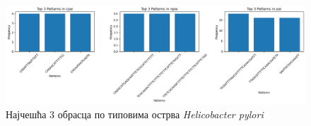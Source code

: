 \documentclass[12pt]{article}
\begin{document}
\begin{figure}[htbp]
    \centering
    \includegraphics[width=\linewidth]{images/top_3_cpai_h_pylori.png}
    \caption{Најчешћа 3 обрасца по типовима острва \textit{Helicobacter pylori}}
    \label{fig:top3_by_islands}
\end{figure}
\end{document}
